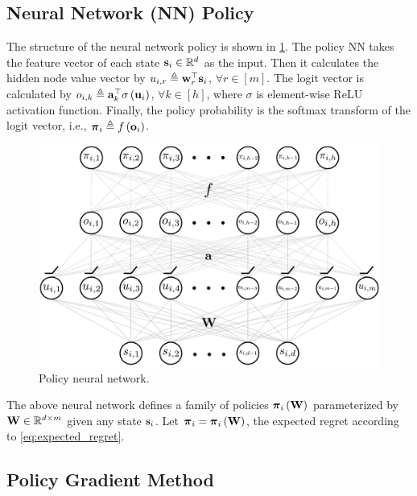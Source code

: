 \subsection{Neural Network (NN) Policy}

The structure of the neural network policy is shown in \cref{fig:nn_policy}. The policy NN takes the feature vector of each state ${\mathbf{s}}_i \in {\mathbb{R}}^d$ as the input. Then it calculates the hidden node value vector by $u_{i,r} \triangleq {\mathbf{w}}_r^\top {\mathbf{s}}_i$, $\forall r \in [m]$. The logit vector is calculated by $o_{i,k} \triangleq {\mathbf{a}}_k^\top \sigma\left( {\mathbf{u}}_i \right)$, $\forall k \in [h]$, where $\sigma$ is element-wise ReLU activation function. Finally, the policy probability is the softmax transform of the logit vector, i.e., ${\boldsymbol{\pi}}_i \triangleq f\left( {\mathbf{o}}_i \right)$.
\begin{figure}[t]
\vskip 0.2in
\begin{center}
\centerline{\includegraphics[width=\columnwidth]{nn_policy.pdf}}
\caption{Policy neural network.}
\label{fig:nn_policy}
\end{center}
\vskip -0.2in
\end{figure}

The above neural network defines a family of policies ${\boldsymbol{\pi}}_i \left( {\mathbf{W}} \right)$ parameterized by ${\mathbf{W}} \in {\mathbb{R}}^{d \times m}$ given any state ${\mathbf{s}}_i$. Let ${\boldsymbol{\pi}}_i = {\boldsymbol{\pi}}_i \left( {\mathbf{W}} \right)$, the expected regret according to \cref{eq:expected_regret}.

\subsection{Policy Gradient Method}

